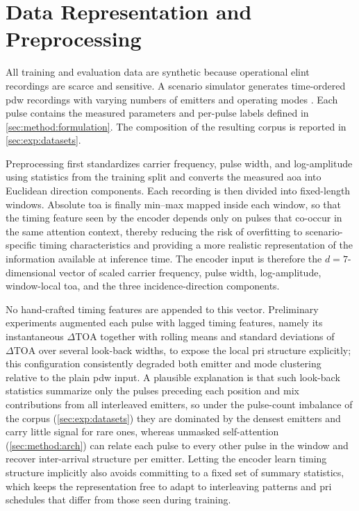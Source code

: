 \section{Data Representation and Preprocessing}\label{sec:method:data}

All training and evaluation data are synthetic because operational \gls{elint} recordings are scarce and sensitive.
A scenario simulator generates time-ordered \gls{pdw} recordings with varying numbers of emitters and operating modes \parencite{jonsson2023supcon}.
Each pulse contains the measured parameters and per-pulse labels defined in \cref{sec:method:formulation}.
The composition of the resulting corpus is reported in \cref{sec:exp:datasets}.

Preprocessing first standardizes carrier frequency, pulse width, and log-amplitude using statistics from the training split and converts the measured \gls{aoa} into Euclidean direction components.
Each recording is then divided into fixed-length windows.
Absolute \gls{toa} is finally min--max mapped inside each window, so that the timing feature seen by the encoder depends only on pulses that co-occur in the same attention context, thereby reducing the risk of overfitting to scenario-specific timing characteristics and providing a more realistic representation of the information available at inference time.
The encoder input is therefore the $d = 7$-dimensional vector of scaled carrier frequency, pulse width, log-amplitude, window-local \gls{toa}, and the three incidence-direction components.

No hand-crafted timing features are appended to this vector.
Preliminary experiments augmented each pulse with lagged timing features, namely its instantaneous $\Delta\mathrm{TOA}$ together with rolling means and standard deviations of $\Delta\mathrm{TOA}$ over several look-back widths, to expose the local \gls{pri} structure explicitly; this configuration consistently degraded both emitter and mode clustering relative to the plain \gls{pdw} input.
A plausible explanation is that such look-back statistics summarize only the pulses preceding each position and mix contributions from all interleaved emitters, so under the pulse-count imbalance of the corpus (\cref{sec:exp:datasets}) they are dominated by the densest emitters and carry little signal for rare ones, whereas unmasked self-attention (\cref{sec:method:arch}) can relate each pulse to every other pulse in the window and recover inter-arrival structure per emitter.
Letting the encoder learn timing structure implicitly also avoids committing to a fixed set of summary statistics, which keeps the representation free to adapt to interleaving patterns and \gls{pri} schedules that differ from those seen during training.


